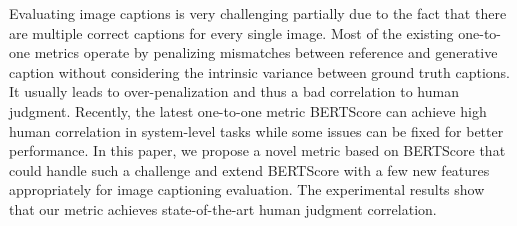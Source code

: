 Evaluating image captions is very challenging partially due to the fact that there are multiple correct captions for every single image. Most of the existing one-to-one metrics operate by penalizing mismatches between reference and generative caption without considering the intrinsic variance between ground truth captions. It usually leads to over-penalization and thus a bad correlation to human judgment. Recently, the latest one-to-one metric BERTScore can achieve high human correlation in system-level tasks while some issues can be fixed for better performance. In this paper, we propose a novel metric based on BERTScore that could handle such a challenge and extend BERTScore with a few new features appropriately for image captioning evaluation. The experimental results show that our metric achieves state-of-the-art human judgment correlation.
